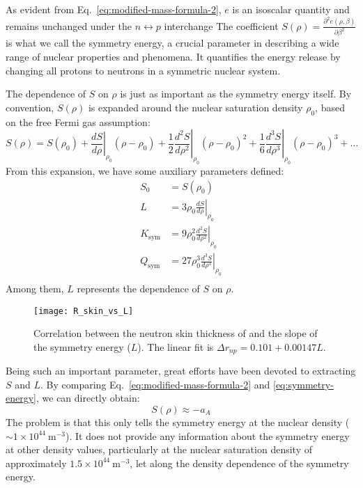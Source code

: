 As evident from Eq.~\ref{eq:modified-mass-formula-2},
$e$ is an isoscalar quantity and remains unchanged under the $n \leftrightarrow p$ interchange 
The coefficient $S(\rho) = \frac{\partial^2 e (\rho, \beta)}{\partial \beta^2}$ is
what we call the symmetry energy, a crucial parameter in describing a wide
range of nuclear properties and phenomena. It quantifies the energy release 
by changing all protons to neutrons in a symmetric nuclear system. 

The dependence of $S$ on $\rho$ is just as important as the symmetry energy itself.
By convention, $S(\rho)$ is expanded around the nuclear saturation density $\rho_0$,
based on the free Fermi gas assumption:
\begin{equation}
    S(\rho) = S(\rho_0) 
    + \left.\frac{dS}{d\rho}\right|_{\rho_0}(\rho - \rho_0)
    + \frac{1}{2}\left.\frac{d^2S}{d\rho^2}\right|_{\rho_0}(\rho - \rho_0)^2
    + \frac{1}{6}\left.\frac{d^3S}{d\rho^3}\right|_{\rho_0}(\rho - \rho_0)^3
    + \dots
\end{equation}
From this expansion, we have some auxiliary parameters defined:
\begin{equation}
    \begin{aligned}
	S_0 &= S(\rho_0)	\\
	L   &= 3\rho_0\left.\frac{dS}{d\rho}\right|_{\rho_0}	\\
	K_{\text{sym}}	&= 9\rho_0^2\left.\frac{d^2S}{d\rho^2}\right|_{\rho_0}	\\
	Q_{\text{sym}}	&= 27\rho_0^3\left.\frac{d^3S}{d\rho^3}\right|_{\rho_0}	\\
    \end{aligned}
\end{equation}
Among them, $L$ represents the dependence of $S$ on $\rho$.
\begin{figure}[!h]
    \centering
    \texttt{[image: R\_skin\_vs\_L]}
    \caption{Correlation between the neutron skin thickness of \Pb and the 
    slope of the symmetry energy ($L$). The linear fit is $\Delta r_{np} = 0.101 + 0.00147 L$.
    \cite{PhysRevLett.106.252501}}
\end{figure}

Being such an important parameter, great efforts have been devoted to extracting $S$ 
and $L$. By comparing Eq.~\ref{eq:modified-mass-formula-2} and \ref{eq:symmetry-energy},
we can directly obtain:
\begin{equation}
    S(\rho) \approx -a_A
\end{equation}
The problem is that this only tells the symmetry energy at the nuclear density ($\sim 1 \times 10^{44}\ \mathrm{m}^{-3}$).
It does not provide any information about the symmetry energy at other density values, 
particularly at the nuclear saturation density of approximately $1.5 \times 10^{44}\ \mathrm{m}^{-3}$, 
let along the density dependence of the symmetry energy. 


